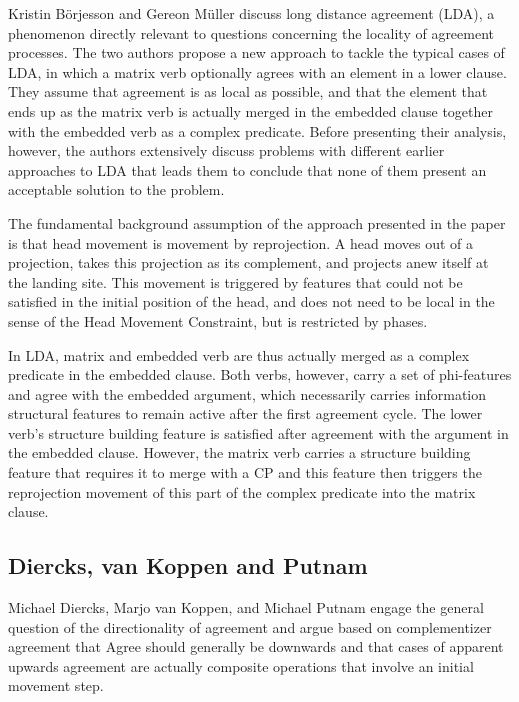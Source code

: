 \documentclass[output=paper
,modfonts
,nonflat]{langsci/langscibook}
\begin{document}
Kristin Börjesson and Gereon Müller discuss long distance agreement (LDA), a phenomenon directly relevant to questions concerning the locality of agreement processes. The two authors propose a new approach to tackle the typical cases of LDA, in which a matrix verb optionally agrees with an element in a lower clause. They assume that agreement is as local as possible, and that the element that ends up as the matrix verb is actually merged in the embedded clause together with the embedded verb as a complex predicate. Before presenting their analysis, however, the authors extensively discuss problems with different earlier approaches to LDA that leads them to conclude that none of them present an acceptable solution to the problem.

The fundamental background assumption of the approach presented in the paper is that head movement is movement by reprojection. A head moves out of a projection, takes this projection as its complement, and projects anew itself at the landing site. This movement is triggered by features that could not be satisfied in the initial position of the head, and does not need to be local in the sense of the Head Movement Constraint, but is restricted by phases.

In LDA, matrix and embedded verb are thus actually merged as a complex predicate in the embedded clause. Both verbs, however, carry a set of phi-features and agree with the embedded argument, which necessarily carries information structural features to remain active after the first agreement cycle. The lower verb’s structure building feature is satisfied after agreement with the argument in the embedded clause. However, the matrix verb carries a structure building feature that requires it to merge with a CP and this feature then triggers the reprojection movement of this part of the complex predicate into the matrix clause.



\subsection{Diercks, van Koppen and Putnam}
\label{sec:diercksetal}

Michael Diercks, Marjo van Koppen, and Michael Putnam engage the general question of the directionality of agreement and argue based on complementizer agreement that Agree should generally be downwards and that cases of apparent upwards agreement are actually composite operations that involve an initial movement step.
\end{document}
